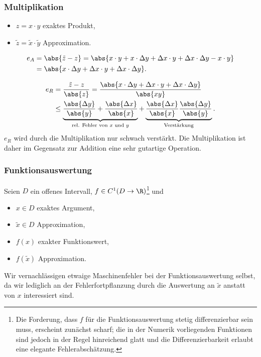 \subsubsection{Multiplikation}
\begin{itemize}[label=-]
  \item $z = x\cdot y$ exaktes Produkt,
  \item $\tilde{z} = \tilde{x}\cdot\tilde{y}$ Approximation.
\end{itemize}
\begin{bemn}
\begin{align*}
e_A &= \abs{\tilde{z}-z} =
 \abs{x\cdot y + x\cdot\Delta y + \Delta x\cdot y +
\Delta x \cdot \Delta y- x\cdot y} \\ &= \abs{x\cdot\Delta y + \Delta x\cdot y +
\Delta x \cdot \Delta y}.
\end{align*}
\end{bemn}
\begin{bemn}
\begin{align*}
e_R &= \frac{\tilde{z}-z}{\abs{z}} = \frac{\abs{x\cdot\Delta y + \Delta x\cdot
y + \Delta x \cdot \Delta y}}{\abs{xy}} \\
&\le \underbrace{\frac{\abs{\Delta y}}{\abs{y}} +
\frac{\abs{\Delta x}}{\abs{x}}}_{\text{rel. Fehler von $x$ und $y$}} +
\underbrace{\frac{\abs{\Delta x}}{\abs{x}} \frac{\abs{\Delta
y}}{\abs{y}}}_{\text{Verstärkung}}.
\end{align*}
$e_R$ wird durch die Multiplikation nur schwach verstärkt. Die Multiplikation
ist daher im Gegensatz zur Addition eine sehr gutartige Operation.
\end{bemn}

\subsubsection{Funktionsauswertung}
Seien $D$ ein offenes Intervall, $f\in C^1(D\to\R)$\footnote{Die Forderung,
dass $f$ für die Funktionsauswertung stetig differenzierbar sein muss, erscheint
zunächst scharf; die in der Numerik vorliegenden Funktionen sind jedoch in der
Regel hinreichend glatt und die Differenzierbarkeit erlaubt eine elegante
Fehlerabschätzung.} und
\begin{itemize}[label=-]
  \item $x\in D$ exaktes Argument,
  \item $\tilde{x}\in D$ Approximation,
  \item $f(x)$ exakter Funktionswert,
  \item $f(\tilde{x})$ Approximation.
\end{itemize}
Wir vernachlässigen etwaige Maschinenfehler bei der Funktionsauswertung selbst,
da wir lediglich an der Fehlerfortpflanzung durch die Auswertung an $\tilde{x}$
anstatt von $x$ interessiert sind.

